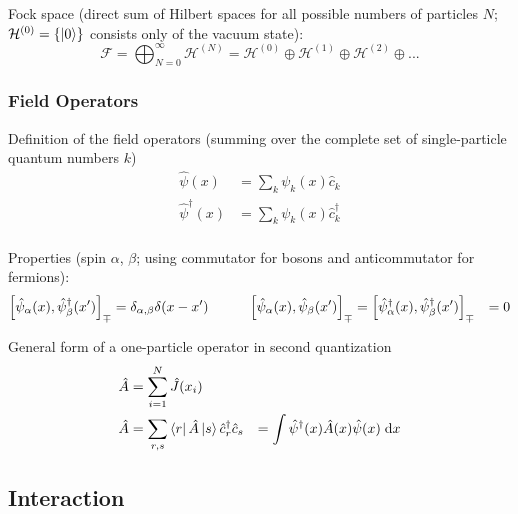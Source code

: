 		\noindent
		Fock space (direct sum of Hilbert spaces for all possible numbers of particles $N$; $\mathcal{H}^{(0)} = \qty{\Ket{0}}$ consists only of the vacuum state):
		\begin{equation}
			\mathcal{F}
			= \bigoplus_{N=0}^{\infty} \mathcal{H}^{(N)}
			= \mathcal{H}^{(0)} \oplus \mathcal{H}^{(1)} \oplus \mathcal{H}^{(2)} \oplus ...
		\end{equation}


		\subsubsection{Field Operators}
			Definition of the field operators (summing over the complete set of single-particle quantum numbers $k$)
			\begin{equation}
				\begin{aligned}
					\hat{\psi} (x) &= \sum_k \psi_k(x) \hat{c}_k \\
					\hat{\psi}^\dagger (x) &= \sum_k \psi_k(x) \hat{c}_k^\dagger \\
				\end{aligned}
			\end{equation}

			\noindent
			Properties (spin $\alpha$, $\beta$; using commutator for bosons and anticommutator for fermions):
			\begin{equation}
				\begin{aligned}
					\comm{\hat{\psi}_\alpha(x)}{\hat{\psi}_\beta^\dagger(x')}_\mp &= \delta_{\alpha,\beta} \delta(x-x')
					&\hspace{20pt}
					\comm{\hat{\psi}_\alpha(x)}{\hat{\psi}_\beta(x')}_\mp
					&= \comm{\hat{\psi}_\alpha^\dagger(x)}{\hat{\psi}_\beta^\dagger(x')}_\mp
					&= 0
				\end{aligned}
			\end{equation}

			\noindent
			General form of a one-particle operator in second quantization
			\begin{equation}
				\begin{aligned}
					\hat{A} &= \sum_{i=1}^N \hat{J}(x_i) \\
					\hat{A} &= \sum_{r,s} \Bra{r}\hat{A}\Ket{s} \hat{c}_r^\dagger \hat{c}_s
					&= \int \hat{\psi}^\dagger(x) \hat{A}(x) \hat{\psi}(x) \; \dd x
				\end{aligned}
			\end{equation}

	\subsection{Interaction}

